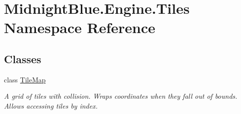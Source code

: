 \hypertarget{namespace_midnight_blue_1_1_engine_1_1_tiles}{}\section{Midnight\+Blue.\+Engine.\+Tiles Namespace Reference}
\label{namespace_midnight_blue_1_1_engine_1_1_tiles}
\subsection*{Classes}
\begin{DoxyCompactItemize}
\item 
class \hyperlink{class_midnight_blue_1_1_engine_1_1_tiles_1_1_tile_map}{Tile\+Map}
\begin{DoxyCompactList}\small\item\em A grid of tiles with collision. Wraps coordinates when they fall out of bounds. Allows accessing tiles by index. \end{DoxyCompactList}\end{DoxyCompactItemize}
